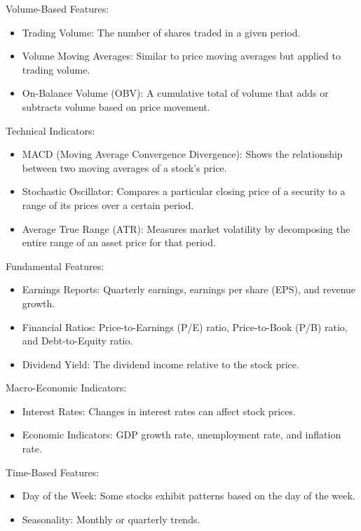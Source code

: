 \documentclass{article}
\begin{document}
Volume-Based Features:

\begin{itemize}
    \item Trading Volume: The number of shares traded in a given period.
    \item Volume Moving Averages: Similar to price moving averages but applied to trading volume.
    \item On-Balance Volume (OBV): A cumulative total of volume that adds or subtracts volume based on price movement.
\end{itemize}

Technical Indicators:

\begin{itemize}
    \item MACD (Moving Average Convergence Divergence): Shows the relationship between two moving averages of a stock’s price.
    \item Stochastic Oscillator: Compares a particular closing price of a security to a range of its prices over a certain period.
    \item Average True Range (ATR): Measures market volatility by decomposing the entire range of an asset price for that period.
\end{itemize}

Fundamental Features:

\begin{itemize}
    \item Earnings Reports: Quarterly earnings, earnings per share (EPS), and revenue growth.
    \item Financial Ratios: Price-to-Earnings (P/E) ratio, Price-to-Book (P/B) ratio, and Debt-to-Equity ratio.
    \item Dividend Yield: The dividend income relative to the stock price.
\end{itemize}

Macro-Economic Indicators:

\begin{itemize}
    \item Interest Rates: Changes in interest rates can affect stock prices.
    \item Economic Indicators: GDP growth rate, unemployment rate, and inflation rate.
\end{itemize}

Time-Based Features:

\begin{itemize}
    \item Day of the Week: Some stocks exhibit patterns based on the day of the week.
    \item Seasonality: Monthly or quarterly trends.
\end{itemize}
\end{document}
